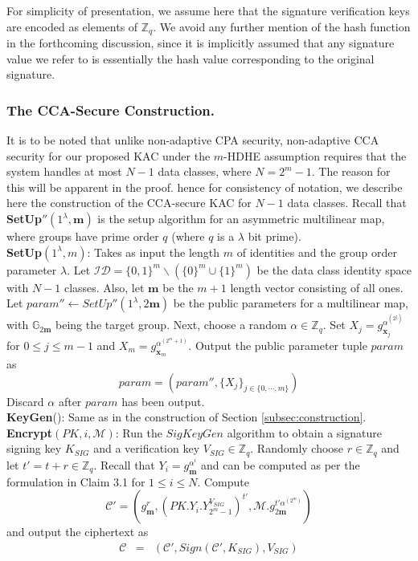 For simplicity of presentation, we assume here that the signature verification keys are encoded as elements of $\mathbb{Z}_q$. We avoid any further mention of the hash function in the forthcoming discussion, since it is implicitly assumed that any signature value we refer to is essentially the hash value corresponding to the original signature.

\subsubsection{The CCA-Secure Construction.}  It is to be noted that unlike non-adaptive CPA security, non-adaptive CCA security for our proposed KAC under the $m$-HDHE assumption requires that the system handles at most $N-1$ data classes, where $N=2^m-1$. The reason for this will be apparent in the proof. hence for consistency of notation, we describe here the construction of the CCA-secure KAC for $N-1$ data classes. Recall that \textbf{SetUp}$''(1^{\lambda},\mathbf{m})$ is the setup algorithm for an asymmetric multilinear map, where groups have prime order $q$ (where $q$ is a $\lambda$ bit prime).\\

\noindent\textbf{SetUp}$(1^{\lambda},m)$: Takes as input the length $m$ of identities and the group order parameter $\lambda$. Let $\mathcal{ID}=\{0,1\}^m\backslash(\{0\}^m\cup\{1\}^m)$ be the data class identity space with $N-1$ classes. Also, let $\mathbf{m}$ be the $m+1$ length vector consisting of all ones. Let $param''\leftarrow SetUp''(1^{\lambda},2\mathbf{m})$ be the public parameters for a multilinear map, with $\mathbb{G}_{2\mathbf{m}}$ being the target group. Next, choose a random $\alpha\in \mathbb{Z}_q$. Set $X_j=g^{\alpha^{(2^j)}}_{\mathbf{x}_j}$ for $0\leq j\leq m-1$ and $X_m=g^{\alpha^{(2^m+1)}}_{\mathbf{x}_m}$. Output the public parameter tuple $param$ as
\begin{equation}
 param = (param'',\{X_j\}_{j\in\{0,\cdots,m\}})\nonumber
\end{equation}
\noindent Discard $\alpha$ after $param$ has been output.\\ 
 
\noindent \textbf{KeyGen}(): Same as in the construction of Section \ref{subsec:construction}.\\
 
\noindent \textbf{Encrypt}$(PK,i,\mathcal{M})$: Run the $SigKeyGen$ algorithm to obtain a signature signing key $K_{SIG}$ and a verification key $V_{SIG} \in \mathbb{Z}_q$. Randomly choose $r\in\mathbb{Z}_q$ and let $t'=t+r \in\mathbb{Z}_q$. Recall that $Y_i=g^{\alpha^i}_{\mathbf{m}}$ and can be computed as per the formulation in Claim 3.1 for $1\leq i\leq N$. Compute 
\begin{equation}
 \mathcal{C}'=(g^r_{\mathbf{m}},(PK.Y_i.Y^{V_{SIG}}_{2^m-1})^{t'},\mathcal{M}.g^{t'\alpha^{(2^m)}}_{2\mathbf{m}})\nonumber
\end{equation} 
\noindent and output the ciphertext as
\begin{eqnarray}
 \mathcal{C}&=&(\mathcal{C}',Sign(\mathcal{C}',K_{SIG}),V_{SIG}) \nonumber
\end{eqnarray} 
 
